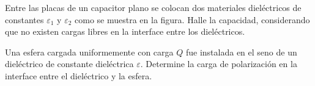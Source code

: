 \documentclass[problemas]{guia}
\begin{document}
\begin{problema}{}
    Entre las placas de un capacitor plano se colocan dos materiales 
    dieléctricos de constantes $\varepsilon_1$ y $\varepsilon_2$ como se 
    muestra en la figura. Halle la capacidad, considerando que no existen 
    cargas libres en la interface entre los dieléctricos.
\end{problema}

\begin{problema}{}
    Una esfera cargada uniformemente con carga $Q$ fue instalada en el seno de
    un dieléctrico de constante dieléctrica $\varepsilon$. Determine la carga 
    de polarización en la interface entre el dieléctrico y la esfera.
\end{problema} 
\end{document}
